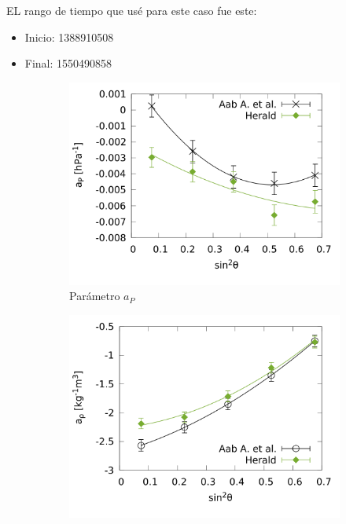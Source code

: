 			EL rango de tiempo que usé para este caso fue este: 
			\begin{itemize}
				\item Inicio: 1388910508
				\item Final: 1550490858
			\end{itemize}
			
				\begin{figure}[H]
					\begin{subfigure}[b]{0.5\textwidth}
					\includegraphics[width=\linewidth]{params/ap_2020_above_1EeV.png}
					\caption{Parámetro $a_P$ }
					\label{fig:ap_2020_1EeV}
					\end{subfigure}%
					\hspace{\fill}
					\begin{subfigure}[b]{0.5\textwidth}
					\includegraphics[width=\linewidth]{params/arho_2020_above_1EeV.png}

\end{subfigure}
\end{figure}
